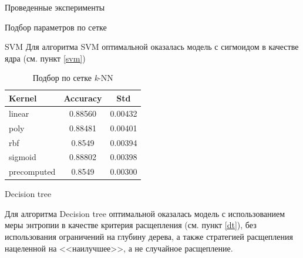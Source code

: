 \begin{section}{Проведенные эксперименты}
\begin{subsection}{Подбор параметров по сетке}
\begin{subsubsection}{SVM}
Для алгоритма SVM оптимальной оказалась модель с сигмоидом в качестве ядра (см. пункт \ref{svm})
  \begin{table}[H]
  \centering
  {\begin{tabular}{|l|c|c|}
  \hline
  \textbf{Kernel} & \textbf{Accuracy} & \textbf{Std} \\
  \hline
  linear & 0.88560 & 0.00432 \\
  \hline
  poly & 0.88481 & 0.00401 \\
  \hline
  rbf & 0.8549 & 0.00394 \\
  \hline
  sigmoid & 0.88802 & 0.00398 \\
  \hline
  precomputed & 0.8549 & 0.00300 \\
  \hline
  \end{tabular}}

  \caption{Подбор по сетке \textit{k}-NN}
  \label{grid:svm}
  \end{table}

\end{subsubsection}

\begin{subsubsection}{Decision tree}

Для алгоритма Decision tree оптимальной оказалась модель с использованием меры энтропии в качестве критерия расщепления (см. пункт \ref{dt}), без использования ограничений на глубину дерева, а также стратегией расщепления нацеленной на <<наилучшее>>, а не случайное расщепление.



\end{subsubsection}
\end{subsection}
\end{section}

